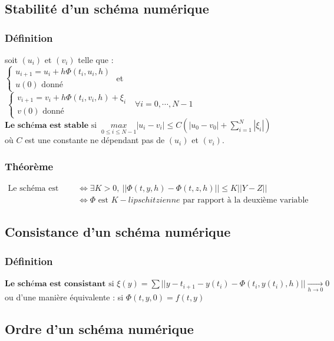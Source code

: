 \documentclass[a4paper,10pt]{report}
\begin{document}
\subsection{Stabilité d'un schéma numérique}
\subsubsection{Définition}
soit $(u_i)$ et $(v_i)$ telle que :\\
$\left\lbrace
\begin{array}{l}
u_{i+1}=u_i+h\Phi (t_i,u_i,h) \\
u(0) \text{ donné}
\end{array}\right.$
et  
$\ \left\lbrace
\begin{array}{l}
v_{i+1}=v_i+h\Phi (t_i,v_i,h) + \xi _i \\
v(0) \text{ donné}
\end{array}\right.
\ \ \ \forall i=0,\cdots , N-1$ \\
$\textbf{Le schéma est stable} \text{ si } \ \underset{0\leq i \leq N-1}{max} |u_i-v_i|\leq C \left( |u_0-v_0|+\sum \limits_{i=1}^N |\xi _i| \right)$\\
où $C$ est une constante ne dépendant pas de $(u_i)$ et $(v_i)$.

\subsubsection{Théorème}
\abovedisplayskip=0mm
\begin{align*}
   \text{Le schéma est stable} & \Leftrightarrow \exists K>0, \ ||\Phi(t,y,h)-\Phi(t,z,h)||\leq K||Y-Z|| \\
							   & \Leftrightarrow \Phi \text{ est } K-lipschitzienne \text{ par rapport à la deuxième variable}
\end{align*} 

\subsection{Consistance d'un schéma numérique}
\subsubsection{Définition}
$\textbf{Le schéma est consistant} \text{ si } \xi(y)=\sum ||y-t_{i+1}-y(t_i)-\Phi(t_i,y(t_i),h)|| \underset{h\rightarrow 0}{\longrightarrow} 0$\\
ou d'une manière équivalente : si $\Phi(t,y,0)=f(t,y)$

\subsection{Ordre d'un schéma numérique}
\end{document}
